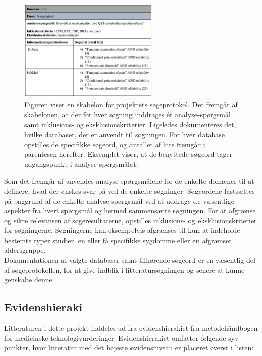\begin{figure}[H]
\begin{center}
\includegraphics[width=0.6\textwidth]{figures/cMetode/spex}
\end{center}
\caption{Figuren viser en skabelon for projektets søgeprotokol. Det fremgår af skabelonen, at der for hver søgning inddrages ét analyse-spørgsmål samt inklusions- og eksklusionskriterier. Ligeledes dokumenteres det, hvilke databaser, der er anvendt til søgningen. For hver database opstilles de specifikke søgeord, og antallet af hits fremgår i parentesen herefter. Eksemplet viser, at de benyttede søgeord tager udgangspunkt i analyse-spørgsmålet.}
\label{fig:soegeprotokol} 
\end{figure} \vspace{-.25cm}
Som det fremgår af  anvendes analyse-spørgsmålene for de enkelte domæner til at definere, hvad der ønskes svar på ved de enkelte søgninger. Søgeordene fastsættes på baggrund af de enkelte analyse-spørgsmål ved at uddrage de væsentlige aspekter fra hvert spørgsmål og hermed sammensætte søgningen. %
For at afgrænse og sikre relevansen af søgeresultaterne, opstilles inklusions- og eksklusionskriterier for søgningerne. Søgningerne kan eksempelvis afgrænses til kun at indeholde bestemte typer studier, en eller få specifikke sygdomme eller en afgrænset aldersgruppe. \citep{metodehaandbogen} \\
Dokumentationen af valgte databaser samt tilhørende søgeord er en væsentlig del af søgeprotokollen, for at give indblik i litteratursøgningen og senere at kunne genskabe denne. \citep{metodehaandbogen}

\subsection{Evidenshieraki}
Litteraturen i dette projekt inddeles ud fra evidenshierakiet fra metodehåndbogen for medicinske teknologivurderinger. \citep{metodehaandbogen} Evidenshierakiet omfatter følgende syv punkter, hvor litteratur med det højeste evidensniveau er placeret øverst i listen:

